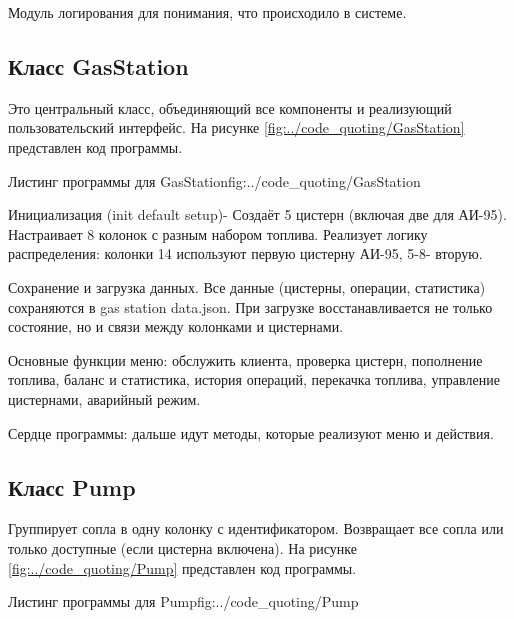 \documentclass{vvsu}
\begin{document}
  Модуль логирования для понимания, что происходило в системе.


\subsection{Класс GasStation}
  Это центральный класс, объединяющий все компоненты и реализующий пользовательский интерфейс.
На рисунке \ref{fig:../code_quoting/GasStation} представлен код программы.

\begin{vvsu_figure}{Листинг программы для GasStation}{fig:../code_quoting/GasStation}
  \begin{minipage}{.75\textwidth}
    
  \end{minipage}
\end{vvsu_figure}

\begin{vvsu_itemize}
  \item Инициализация (init default setup)- Создаёт 5 цистерн (включая две для АИ-95). Настраивает 8 колонок с разным набором топлива. Реализует логику распределения: колонки 14 используют первую цистерну АИ-95, 5-8- вторую.
  \item Сохранение и загрузка данных. Все данные (цистерны, операции, статистика) сохраняются в gas station data.json. При загрузке восстанавливается не только состояние, но и связи между колонками и цистернами.
  \item Основные функции меню: обслужить клиента, проверка цистерн, пополнение топлива, баланс и статистика, история операций, перекачка топлива, управление цистернами, аварийный режим.
\end{vvsu_itemize}
  
  Сердце программы: дальше идут методы, которые реализуют меню и действия.


\subsection{Класс Pump}
  Группирует сопла в одну колонку с идентификатором. Возвращает все сопла или только доступные (если цистерна включена).
На рисунке \ref{fig:../code_quoting/Pump} представлен код программы.

\begin{vvsu_figure}{Листинг программы для Pump}{fig:../code_quoting/Pump}
  \begin{minipage}{.75\textwidth}
    
  \end{minipage}
\end{vvsu_figure}
\end{document}
